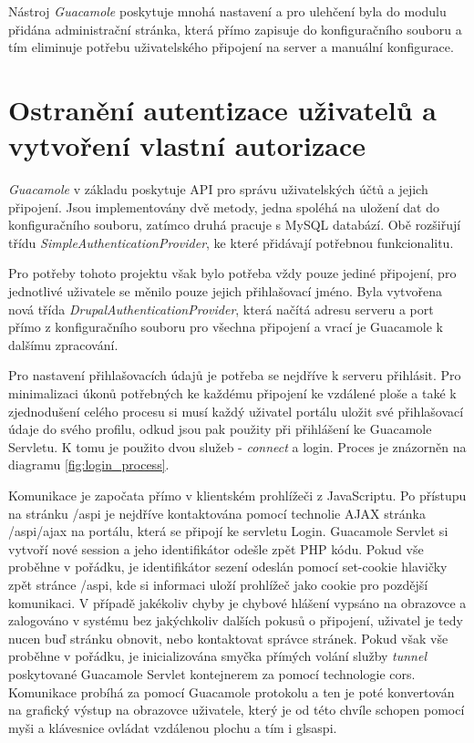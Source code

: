 Nástroj \emph{Guacamole} poskytuje mnohá nastavení a pro ulehčení byla do modulu přidána administrační stránka, která přímo zapisuje do konfiguračního souboru a tím eliminuje potřebu uživatelského připojení na server a manuální konfigurace. 

\section{Ostranění autentizace uživatelů a vytvoření vlastní autorizace}
\emph{Guacamole} v základu poskytuje API pro správu uživatelských účtů a jejich připojení. Jsou implementovány dvě metody, jedna spoléhá na uložení dat do konfiguračního souboru, zatímco druhá pracuje s MySQL databází. Obě rozšiřují třídu \emph{SimpleAuthenticationProvider}, ke které přidávají potřebnou funkcionalitu. 

Pro potřeby tohoto projektu však bylo potřeba vždy pouze jediné připojení, pro jednotlivé uživatele se měnilo pouze jejich přihlašovací jméno. Byla vytvořena nová třída \emph{DrupalAuthenticationProvider}, která načítá adresu serveru a port přímo z konfiguračního souboru pro všechna připojení a vrací je Guacamole k dalšímu zpracování. 

Pro nastavení přihlašovacích údajů je potřeba se nejdříve k serveru přihlásit. Pro minimalizaci úkonů potřebných ke každému připojení ke vzdálené ploše a také k zjednodušení celého procesu si musí každý uživatel portálu uložit své přihlašovací údaje do svého profilu, odkud jsou pak použity při přihlášení ke Guacamole Servletu. K tomu je použito dvou služeb - \emph{connect} a {login}. Proces je znázorněn na diagramu \ref{fig:login_process}. 

Komunikace je započata přímo v klientském prohlížeči z JavaScriptu. Po přístupu na stránku /aspi je nejdříve kontaktována pomocí technolie AJAX stránka /aspi/ajax na portálu, která se připojí ke servletu Login. Guacamole Servlet si vytvoří nové \gls{session} a jeho identifikátor odešle zpět PHP kódu. Pokud vše proběhne v pořádku, je identifikátor sezení odeslán pomocí set-cookie hlavičky zpět stránce /aspi, kde si informaci uloží prohlížeč jako cookie pro pozdější komunikaci. V případě jakékoliv chyby je chybové hlášení vypsáno na obrazovce a zalogováno v systému bez jakýchkoliv dalších pokusů o připojení, uživatel je tedy nucen buď stránku obnovit, nebo kontaktovat správce stránek. Pokud však vše proběhne v pořádku, je inicializována smyčka přímých volání služby \emph{tunnel} poskytované Guacamole Servlet kontejnerem za pomocí technologie \gls{cors}. Komunikace probíhá za pomocí Guacamole protokolu a ten je poté konvertován na grafický výstup na obrazovce uživatele, který je od této chvíle schopen pomocí myši a klávesnice ovládat vzdálenou plochu a tím i gls{aspi}.

